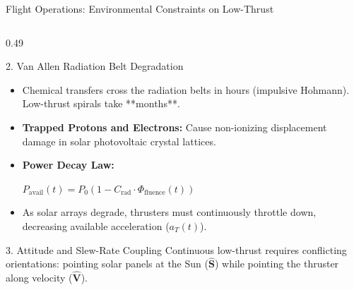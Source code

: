 \documentclass[aspectratio=169, 10pt]{beamer}
\begin{document}
\begin{frame}{Flight Operations: Environmental Constraints on Low-Thrust}
\begin{columns}[T]
        \begin{column}{0.49\textwidth}
            \begin{exampleblock}{2. Van Allen Radiation Belt Degradation}
                \scriptsize
                \begin{itemize}\setlength{\itemsep}{1.5pt}\setlength{\topsep}{0pt}
                    \item Chemical transfers cross the radiation belts in hours (impulsive Hohmann). Low-thrust spirals take **months**.
                    \item \textbf{Trapped Protons and Electrons:} Cause non-ionizing displacement damage in solar photovoltaic crystal lattices.
                    \item \textbf{Power Decay Law:}
                    \par\vspace{1pt}
                    {\centering $\displaystyle P_{\text{avail}}(t) = P_0 \left(1 - C_{\text{rad}} \cdot \Phi_{\text{fluence}}(t)\right)$ \par}
                    \item As solar arrays degrade, thrusters must continuously throttle down, decreasing available acceleration ($a_T(t)$).
                \end{itemize}
            \end{exampleblock}
            \vspace{-0.15cm}
            \begin{block}{3. Attitude and Slew-Rate Coupling}
                \scriptsize
                Continuous low-thrust requires conflicting orientations: pointing solar panels at the Sun ($\hat{\mathbf{S}}$) while pointing the thruster along velocity ($\hat{\mathbf{V}}$).
            \end{block}
        \end{column}
    \end{columns}
\end{frame}
\end{document}
